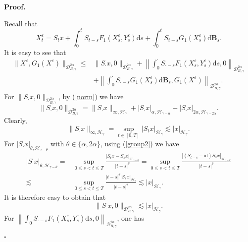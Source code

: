 \documentclass[10pt,a4paper]{article}
\numberwithin{equation}{section}
\newenvironment{proof}[1][\normalfont\bfseries Proof]{%
	\noindent #1.\hspace{0.5em}%
	\ignorespaces%
}{%
	\hfill $\square$%
	\par%
}
\begin{document}
	\begin{proof}
		Recall that
		\begin{equation*}
			X_t^\varepsilon=S_t x+\int_0^t S_{t-s} F_1 (X_s^\varepsilon,Y_s^\varepsilon) \mathrm{d} s+ \int_0^t S_{t-s} G_1 (X_s^\varepsilon) \mathrm{d} \mathbf{B}_s.
		\end{equation*}
		It is easy to see that
		\begin{align*}
			\|X^\varepsilon,G_1(X^\varepsilon)\|_{\mathcal{D}_{B,\gamma}^{2\alpha}}
			\leq & \|S_\cdot x, 0 \|_{\mathcal{D}_{B,\gamma}^{2\alpha}}
			+\left\|\int_0^\cdot S_{\cdot-s} F_1(X_s^\varepsilon,Y_s^\varepsilon) \mathrm{d} s, 0 \right\|_{\mathcal{D}_{B,\gamma}^{2\alpha}}\\
			&+\left\|\int_0^\cdot S_{\cdot-s} G_1(X_s^\varepsilon) \mathrm{d} \mathbf B_s, G_1(X^\varepsilon) \right\|_{\mathcal{D}_{B,\gamma}^{2\alpha}}.
		\end{align*}
		For $\|S_\cdot x, 0 \|_{\mathcal{D}_{B,\gamma}^{2\alpha}}$, by (\ref{norm}) we have
		$$\|S_\cdot x, 0\|_{\mathcal{D}_{B,\gamma}^{2\alpha}}=\|S_\cdot x\|_{\infty, \mathcal H_\gamma}+|S_\cdot x|_{\alpha,\mathcal H_{\gamma-\alpha}}+|S_\cdot x|_{2\alpha,\mathcal H_{\gamma-2\alpha}}.$$
		Clearly,
		\begin{equation*}
			\|S_\cdot x\|_{\infty, \mathcal H_\gamma}=\sup_{t \in [0,T]} |S_t x|_{\mathcal H_\gamma} \lesssim |x|_{\mathcal H_\gamma}.
		\end{equation*}	
		For $|S_\cdot x|_{\theta,\mathcal H_{\gamma-\theta}}$ with $\theta \in \{\alpha, 2\alpha\}$, using (\ref{group2}) we have
		\begin{align*}
			|S_\cdot x|_{\theta,\mathcal H_{\gamma-\theta}}
			= & \sup_{0\leq s<t \leq T}  \frac{|S_t x-S_s x|_{\mathcal H_{\gamma-\theta}}}{|t-s|^\theta}
			=\sup_{0\leq s<t \leq T}  \frac{|(S_{t-s}-\mathrm{id} )S_s x|_{\mathcal H_{\gamma-\theta}}}{|t-s|^\theta} \\
			\lesssim & \sup_{0\leq s<t \leq T}  \frac{|t-s|^\theta  |S_s x|_{\mathcal H_\gamma}}{|t-s|^\theta}
			\lesssim |x|_{\mathcal H_\gamma}.
		\end{align*}
		It is therefore easy to obtain that
		\begin{equation}\label{xest}
			\|S_\cdot x, 0\|_{\mathcal{D}_{B,\gamma}^{2\alpha}} \lesssim |x|_{\mathcal H_\gamma}.
		\end{equation}
		For $ \left\|\int_0^\cdot S_{\cdot-s} F_1(X_s^\varepsilon,Y_s^\varepsilon) \mathrm{d} s, 0 \right\|_{\mathcal{D}_{B,\gamma}^{2\alpha}}$, one has
		\begin{align*}%

\end{align*}
\end{proof}
\end{document}
